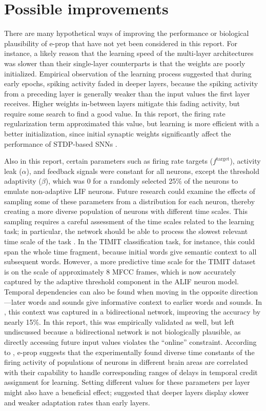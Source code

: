 \section{Possible improvements}
    There are many hypothetical ways of improving the performance or biological plausibility of e-prop that have not yet been considered in this report.
    For instance, a likely reason that the learning speed of the multi-layer architectures was slower than their single-layer counterparts is that the weights are poorly initialized.
    Empirical observation of the learning process suggested that during early epochs, spiking activity faded in deeper layers, because the spiking activity from a preceding layer is generally weaker than the input values the first layer receives.
    Higher weights in-between layers mitigate this fading activity, but require some search to find a good value.
    In this report, the firing rate regularization term approximated this value, but learning is more efficient with a better initialization, since initial synaptic weights significantly affect the performance of STDP-based SNNs \citep{kim2020initial}.

    Also in this report, certain parameters such as firing rate targets ($f^\text{target}$), activity leak ($\alpha$), and feedback signals were constant for all neurons, except the threshold adaptivity ($\beta$), which was 0 for a randomly selected 25\% of the neurons to emulate non-adaptive LIF neurons.
    Future research could examine the effects of sampling some of these parameters from a distribution for each neuron, thereby creating a more diverse population of neurons with different time scales.
    This sampling requires a careful assessment of the time scales related to the learning task; in particular, the network should be able to process the slowest relevant time scale of the task \citep{jaeger2021dimensions}.
    In the TIMIT classification task, for instance, this could span the whole time fragment, because initial words give semantic context to all subsequent words.
    However, a more predictive time scale for the TIMIT dataset is on the scale of approximately 8 MFCC frames, which is now accurately captured by the adaptive threshold component in the ALIF neuron model.
    Temporal dependencies can also be found when moving in the opposite direction---later words and sounds give informative context to earlier words and sounds.
    In \citet{bellec2020solution}, this context was captured in a bidirectional network, improving the accuracy by nearly 15\%.
    In this report, this was empirically validated as well, but left undiscussed because a bidirectional network is not biologically plausible, as directly accessing future input values violates the ``online'' constraint.
    According to \citet{bellec2020solution}, e-prop suggests that the experimentally found diverse time constants of the firing activity of populations of neurons in different brain areas \citep{runyan2017distinct} are correlated with their capability to handle corresponding ranges of delays in temporal credit assignment for learning.
    Setting different values for these parameters per layer might also have a beneficial effect; \citet{ahmed1998estimates} suggested that deeper layers display slower and weaker adaptation rates than early layers.

